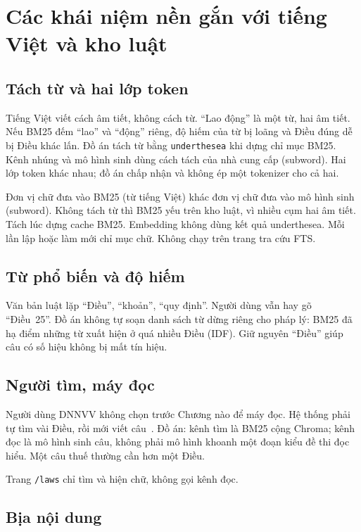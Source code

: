 \section{Các khái niệm nền gắn với tiếng Việt và kho luật}

\subsection{Tách từ và hai lớp token}

Tiếng Việt viết cách âm tiết, không cách từ. ``Lao động'' là một từ, hai âm
tiết. Nếu BM25 đếm ``lao'' và ``động'' riêng, độ hiếm của từ bị loãng và Điều
đúng dễ bị Điều khác lấn. Đồ án tách từ bằng \texttt{underthesea} khi dựng chỉ
mục BM25. Kênh nhúng và mô hình sinh dùng cách tách của nhà cung cấp (subword).
Hai lớp token khác nhau; đồ án chấp nhận và không ép một tokenizer cho cả hai.

\boncau
{Đơn vị chữ đưa vào BM25 (từ tiếng Việt) khác đơn vị chữ đưa vào mô hình sinh
(subword).}
{Không tách từ thì BM25 yếu trên kho luật, vì nhiều cụm hai âm tiết.}
{Tách lúc dựng cache BM25. Embedding không dùng kết quả underthesea.}
{Mỗi lần lập hoặc làm mới chỉ mục chữ. Không chạy trên trang tra cứu FTS.}

\subsection{Từ phổ biến và độ hiếm}

Văn bản luật lặp ``Điều'', ``khoản'', ``quy định''. Người dùng vẫn hay gõ
``Điều~25''. Đồ án không tự soạn danh sách từ dừng riêng cho pháp lý: BM25 đã
hạ điểm những từ xuất hiện ở quá nhiều Điều (IDF). Giữ nguyên ``Điều'' giúp câu
có số hiệu không bị mất tín hiệu.

\subsection{Người tìm, máy đọc}

Người dùng DNNVV không chọn trước Chương nào để máy đọc. Hệ thống phải tự tìm
vài Điều, rồi mới viết câu~\cite{karpukhin2020dpr}. Đồ án: kênh tìm là BM25 cộng
Chroma; kênh đọc là mô hình sinh câu, không phải mô hình khoanh một đoạn kiểu
đề thi đọc hiểu. Một câu thuế thường cần hơn một Điều.

Trang \texttt{/laws} chỉ tìm và hiện chữ, không gọi kênh đọc.

\subsection{Bịa nội dung}

